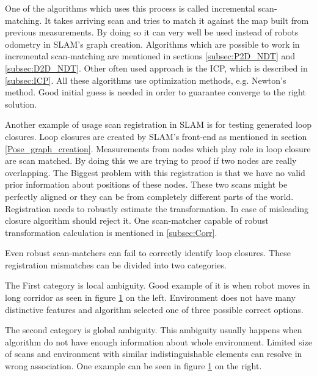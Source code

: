 One of the algorithms which uses this process is called incremental scan-matching. It takes arriving scan and tries to match it against the map built from previous measurements. By doing so it can very well be used instead of robots odometry in \gls{SLAM}'s graph creation. Algorithms which are possible to work in incremental scan-matching are mentioned in sections \ref{subsec:P2D_NDT} and \ref{subsec:D2D_NDT}. Other often used approach is the \gls{ICP}, which is described in \ref{subsec:ICP}. All these algorithms use optimization methods, e.g. Newton's method. Good initial guess is needed in order to guarantee converge to the right solution. 

Another example of usage scan registration in \gls{SLAM} is for testing generated loop closures. Loop closures are created by \gls{SLAM}'s front-end as mentioned in section \ref{Pose_graph_creation}. Measurements from nodes which play role in loop closure are scan matched. By doing this we are trying to proof if two nodes are really overlapping.  The Biggest problem with this registration is that we have no valid prior information about positions of these nodes. These two scans might be perfectly aligned or they can be from completely different parts of the world. Registration needs to robustly estimate the transformation. In case of misleading closure algorithm should reject it. One scan-matcher capable of robust transformation calculation is mentioned in \ref{subsec:Corr}.  


Even robust scan-matchers can fail to correctly identify loop closures.  These registration mismatches can be divided into two categories.

The First category is local ambiguity. Good example of it is when robot moves in long corridor as seen in figure \ref{Pic_coridor} on the left. Environment does not have many distinctive features and algorithm selected one of three possible correct options.

The second category is global ambiguity. This ambiguity usually happens when algorithm do not have enough information about whole environment. Limited size of scans and environment with similar indistinguishable elements can resolve in wrong association. One example can be seen in figure \ref{Pic_coridor} on the right.   
     
 \begin{figure}
 \label{Pic_coridor}

 \end{figure}

  \newpage
